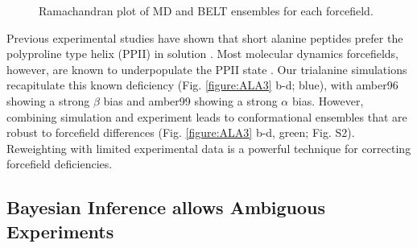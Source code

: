 \documentclass[journal=jacsat,manuscript=article]{achemso}
\begin{document}
\begin{figure}

\caption{
Ramachandran plot of MD and BELT ensembles for each forcefield.
}
\label{figure:Rama}
\end{figure}

Previous experimental studies have shown that short alanine peptides prefer the polyproline type helix (PPII) in solution \cite{Grdadolnik2011, Graf2007, Avbelj2006}.  Most molecular dynamics forcefields, however, are known to underpopulate the PPII state \cite{Graf2007,beauchamp2012protein,Nerenberg2011, Best2008}.  Our trialanine simulations recapitulate this known deficiency (Fig. \ref{figure:ALA3} b-d; blue), with amber96 showing a strong $\beta$ bias and amber99 showing a strong $\alpha$ bias.  However, combining simulation and experiment leads to conformational ensembles that are robust to forcefield differences (Fig. \ref{figure:ALA3} b-d, green; Fig. S2).  Reweighting with limited experimental data is a powerful technique for correcting forcefield deficiencies.  


\subsection{Bayesian Inference allows Ambiguous Experiments}
\end{document}
